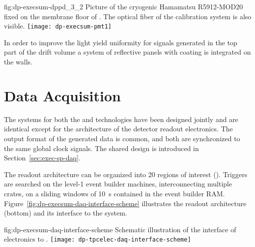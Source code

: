 \begin{dunefigure}{fig:dp-execsum-dppd_3_2}
{Picture of the cryogenic Hamamatsu R5912-MOD20  fixed on the membrane floor of . The optical fiber of the calibration system is also visible.}
\texttt{[image: dp-execsum-pmt1]}
\end{dunefigure}

In order to improve the light yield uniformity for signals generated in the top part of the drift volume a system of reflective panels with  coating is integrated on the   walls.


\section{Data Acquisition}
\label{sec:dp-execsum-daq}

The  systems for both the  and  technologies have been designed jointly and are identical except for the architecture of the detector readout electronics.  The output format of the generated data is common, and both are synchronized to the same global clock signals. The shared  design is introduced in Section~\ref{sec:exec-sp-daq}.

The  readout architecture can be organized into \num{20} regions of interest (). %
Triggers are searched on the level-1 event builder machines, interconnecting multiple  crates, on a sliding windows of \SI{10}{s} contained in the event builder RAM.
Figure~\ref{fig:dp-execsum-daq-interface-scheme} illustrates the  readout architecture (bottom) and its interface to the  system.
  
\begin{dunefigure}{fig:dp-execsum-daq-interface-scheme}
{Schematic illustration of the interface of   electronics to .}
\texttt{[image: dp-tpcelec-daq-interface-scheme]}
\end{dunefigure}

